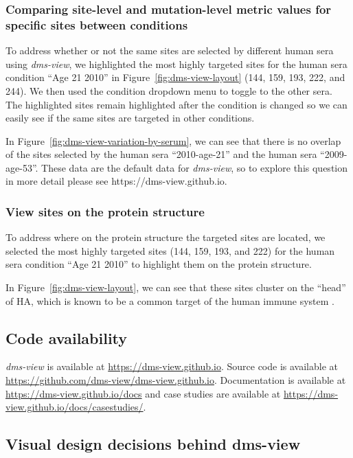 \subsubsection{Comparing site-level and mutation-level metric values for specific sites between conditions}

To address whether or not the same sites are selected by different human sera using \emph{dms-view}, we highlighted the most highly targeted sites for the human sera condition ``Age 21 2010'' in Figure~\ref{fig:dms-view-layout} (144, 159, 193, 222, and 244).
We then used the condition dropdown menu to toggle to the other sera.
The highlighted sites remain highlighted after the condition is changed so we can easily see if the same sites are targeted in other conditions.

In Figure~\ref{fig:dms-view-variation-by-serum}, we can see that there is no overlap of the sites selected by the human sera ``2010-age-21'' and the human sera ``2009-age-53''.
These data are the default data for \emph{dms-view}, so to explore this question in more detail please see https://dms-view.github.io.

\subsubsection{View sites on the protein structure}

To address where on the protein structure the targeted sites are located, we selected the most highly targeted sites (144, 159, 193, and 222) for the human sera condition ``Age 21 2010'' to highlight them on the protein structure.

In Figure~\ref{fig:dms-view-layout}, we can see that these sites cluster on the ``head'' of HA, which is known to be a common target of the human immune system \citep{Chambers:2015jt}.

\subsection{Code availability}

\emph{dms-view} is available at \url{https://dms-view.github.io}.
Source code is available at \url{https://github.com/dms-view/dms-view.github.io}.
Documentation is available at \url{https://dms-view.github.io/docs} and case studies are available at \url{https://dms-view.github.io/docs/casestudies/}.

\subsection{Visual design decisions behind dms-view}
\label{subsec:visual-design-decisions}

